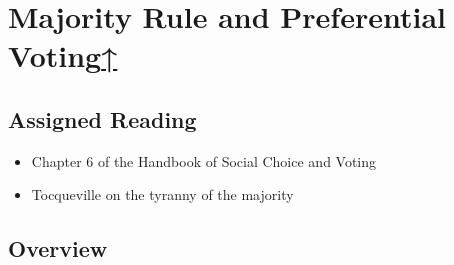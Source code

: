 \label{cur:majority}
\section{Majority Rule and Preferential Voting\hyperref[syllabus]{↑}}

\subsection{Assigned Reading}

\begin{itemize}
    \item Chapter 6 of the Handbook of Social Choice and Voting \autocite[83-99]{Heckelman2015}

    \item Tocqueville on the tyranny of the majority \autocite{Tocqueville2010}
\end{itemize}

\subsection{Overview}

